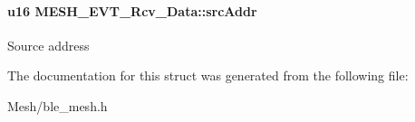 \paragraph[{\texorpdfstring{src\+Addr}{srcAddr}}]{\setlength{\rightskip}{0pt plus 5cm}u16 M\+E\+S\+H\+\_\+\+E\+V\+T\+\_\+\+Rcv\+\_\+\+Data\+::src\+Addr}\hypertarget{struct_m_e_s_h___e_v_t___rcv___data_a6acc0e85a53e7fe26c6f287004b2de38}{}\label{struct_m_e_s_h___e_v_t___rcv___data_a6acc0e85a53e7fe26c6f287004b2de38}
Source address 

The documentation for this struct was generated from the following file\+:\begin{DoxyCompactItemize}
\item 
Mesh/ble\+\_\+mesh.\+h\end{DoxyCompactItemize}
